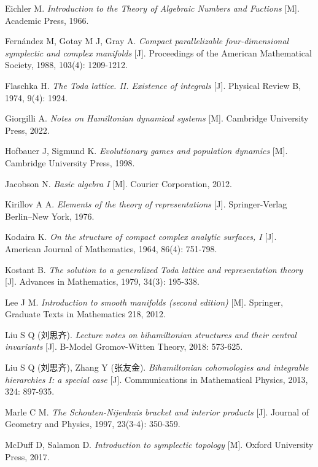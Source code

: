 \documentclass[12pt, b5paper]{article}   %
\begin{document}
\begin{thebibliography}{99}
Eichler M.
\textit{Introduction to the Theory of Algebraic Numbers and Fuctions} [M]. Academic Press, 1966.

Fernández M, Gotay M J, Gray A.
\textit{Compact parallelizable four-dimensional symplectic and complex manifolds} [J].
Proceedings of the American Mathematical Society, 1988, 103(4): 1209-1212.

Flaschka H.
\textit{The Toda lattice. II. Existence of integrals} [J]. Physical Review B, 1974, 9(4): 1924.

Giorgilli A.
\textit{Notes on Hamiltonian dynamical systems} [M]. Cambridge University Press, 2022.

Hofbauer J, Sigmund K.
\textit{Evolutionary games and population dynamics} [M].
Cambridge University Press, 1998.

Jacobson N. \textit{Basic algebra I} [M]. Courier Corporation, 2012.

Kirillov A A. \textit{Elements of the theory of representations} [J].
Springer-Verlag
Berlin–New York, 1976.

Kodaira K.
\textit{On the structure of compact complex analytic surfaces, I} [J].
American Journal of Mathematics, 1964, 86(4): 751-798.

Kostant B.
\textit{The solution to a generalized Toda lattice and representation theory} [J].
Advances in Mathematics, 1979, 34(3): 195-338.

Lee J M. \textit{Introduction to smooth manifolds (second edition)} [M].
Springer, Graduate Texts in Mathematics 218, 2012.

Liu S Q (刘思齐).
\textit{Lecture notes on bihamiltonian structures and their central invariants} [J].
B-Model Gromov-Witten Theory, 2018: 573-625.

Liu S Q (刘思齐), Zhang Y (张友金).
\textit{Bihamiltonian cohomologies and integrable hierarchies I: a special case} [J].
Communications in Mathematical Physics, 2013, 324: 897-935.

Marle C M.
\textit{The Schouten-Nijenhuis bracket and interior products} [J].
Journal of Geometry and Physics, 1997, 23(3-4): 350-359.

McDuff D, Salamon D.
\textit{Introduction to symplectic topology} [M]. Oxford University Press, 2017.


\end{thebibliography}
\end{document}
